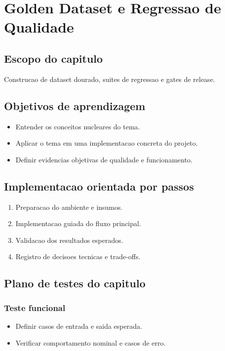 \chapter{Golden Dataset e Regressao de Qualidade}
\label{chap:golden_dataset_regressao}

\section{Escopo do capitulo}
Construcao de dataset dourado, suites de regressao e gates de release.

\section{Objetivos de aprendizagem}
\begin{itemize}[leftmargin=*]
  \item Entender os conceitos nucleares do tema.
  \item Aplicar o tema em uma implementacao concreta do projeto.
  \item Definir evidencias objetivas de qualidade e funcionamento.
\end{itemize}

\section{Implementacao orientada por passos}
\begin{enumerate}[leftmargin=*]
  \item Preparacao do ambiente e insumos.
  \item Implementacao guiada do fluxo principal.
  \item Validacao dos resultados esperados.
  \item Registro de decisoes tecnicas e trade-offs.
\end{enumerate}

\section{Plano de testes do capitulo}
\subsection{Teste funcional}
\begin{itemize}[leftmargin=*]
  \item Definir casos de entrada e saida esperada.
  \item Verificar comportamento nominal e casos de erro.
\end{itemize}

